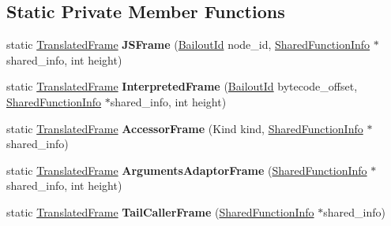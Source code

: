 \subsection*{Static Private Member Functions}
\begin{DoxyCompactItemize}
\item 
static \hyperlink{classv8_1_1internal_1_1_translated_frame}{Translated\+Frame} {\bfseries J\+S\+Frame} (\hyperlink{classv8_1_1internal_1_1_bailout_id}{Bailout\+Id} node\+\_\+id, \hyperlink{classv8_1_1internal_1_1_shared_function_info}{Shared\+Function\+Info} $\ast$shared\+\_\+info, int height)\hypertarget{classv8_1_1internal_1_1_translated_frame_ac254551631bef0c94b37d50cff8d08b0}{}\label{classv8_1_1internal_1_1_translated_frame_ac254551631bef0c94b37d50cff8d08b0}

\item 
static \hyperlink{classv8_1_1internal_1_1_translated_frame}{Translated\+Frame} {\bfseries Interpreted\+Frame} (\hyperlink{classv8_1_1internal_1_1_bailout_id}{Bailout\+Id} bytecode\+\_\+offset, \hyperlink{classv8_1_1internal_1_1_shared_function_info}{Shared\+Function\+Info} $\ast$shared\+\_\+info, int height)\hypertarget{classv8_1_1internal_1_1_translated_frame_ae8ad8345a17e3580f3a2e8a4a754a1ca}{}\label{classv8_1_1internal_1_1_translated_frame_ae8ad8345a17e3580f3a2e8a4a754a1ca}

\item 
static \hyperlink{classv8_1_1internal_1_1_translated_frame}{Translated\+Frame} {\bfseries Accessor\+Frame} (Kind kind, \hyperlink{classv8_1_1internal_1_1_shared_function_info}{Shared\+Function\+Info} $\ast$shared\+\_\+info)\hypertarget{classv8_1_1internal_1_1_translated_frame_a80a44a6d404315fd49afa16e426d5622}{}\label{classv8_1_1internal_1_1_translated_frame_a80a44a6d404315fd49afa16e426d5622}

\item 
static \hyperlink{classv8_1_1internal_1_1_translated_frame}{Translated\+Frame} {\bfseries Arguments\+Adaptor\+Frame} (\hyperlink{classv8_1_1internal_1_1_shared_function_info}{Shared\+Function\+Info} $\ast$shared\+\_\+info, int height)\hypertarget{classv8_1_1internal_1_1_translated_frame_a6135fc340cf352e046ae08cdfef78d17}{}\label{classv8_1_1internal_1_1_translated_frame_a6135fc340cf352e046ae08cdfef78d17}

\item 
static \hyperlink{classv8_1_1internal_1_1_translated_frame}{Translated\+Frame} {\bfseries Tail\+Caller\+Frame} (\hyperlink{classv8_1_1internal_1_1_shared_function_info}{Shared\+Function\+Info} $\ast$shared\+\_\+info)\hypertarget{classv8_1_1internal_1_1_translated_frame_a6507d0f57b3f77e29d1019ccb34d8881}{}\label{classv8_1_1internal_1_1_translated_frame_a6507d0f57b3f77e29d1019ccb34d8881}


\end{DoxyCompactItemize}
